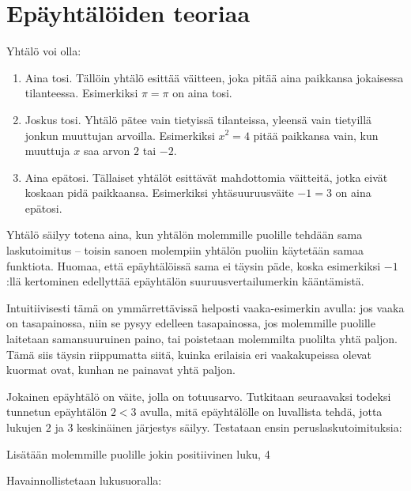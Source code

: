 \section{Epäyhtälöiden teoriaa}

Yhtälö voi olla:

\begin{enumerate}
\item Aina tosi. Tällöin yhtälö esittää väitteen, joka pitää aina paikkansa jokaisessa tilanteessa. Esimerkiksi $\pi=\pi$ on aina tosi.
\item Joskus tosi. Yhtälö pätee vain tietyissä tilanteissa, yleensä vain tietyillä jonkun muuttujan arvoilla. Esimerkiksi $x^2=4$ pitää paikkansa vain, kun muuttuja $x$ saa arvon $2$ tai $-2$.
\item Aina epätosi. Tällaiset yhtälöt esittävät mahdottomia väitteitä, jotka eivät koskaan pidä paikkaansa. Esimerkiksi yhtäsuuruusväite $-1=3$ on aina epätosi.
\end{enumerate}

Yhtälö säilyy totena aina, kun yhtälön molemmille puolille tehdään sama laskutoimitus – toisin sanoen molempiin yhtälön puoliin käytetään samaa funktiota. Huomaa, että epäyhtälöissä sama ei täysin päde, koska esimerkiksi $-1$:llä kertominen edellyttää epäyhtälön suuruusvertailumerkin kääntämistä.

Intuitiivisesti tämä on ymmärrettävissä helposti vaaka-esimerkin avulla: jos
vaaka on tasapainossa, niin se pysyy edelleen tasapainossa, jos molemmille
puolille laitetaan samansuuruinen paino, tai poistetaan molemmilta puolilta
yhtä paljon. Tämä siis täysin riippumatta siitä, kuinka erilaisia eri
vaakakupeissa olevat kuormat ovat, kunhan ne painavat yhtä paljon.

Jokainen epäyhtälö on väite, jolla on totuusarvo. Tutkitaan seuraavaksi todeksi tunnetun epäyhtälön $2<3$ avulla, mitä epäyhtälölle on luvallista tehdä, jotta lukujen $2$ ja $3$ keskinäinen järjestys säilyy. Testataan ensin peruslaskutoimituksia:

Lisätään molemmille puolille jokin positiivinen luku, 4

Havainnollistetaan lukusuoralla:

\begin{lukusuora}{-1}{10}{12}

\lukusuorauusi
\end{lukusuora}

